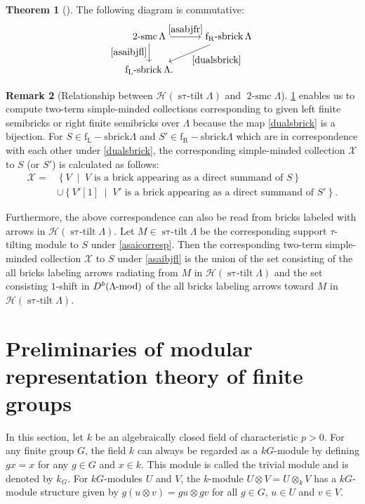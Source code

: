 \documentclass[pdftex,a4paper]{article}
\numberwithin{equation}{subsection}
\theoremstyle{definition}
\newtheorem{theorem}{Theorem}[section]
\newtheorem{remark}[theorem]{Remark}
\newcommand{\setmid}{\; \middle|\;}
\newcommand{\lmod}{\operatorname{\mathrm{\hspace{-2pt}-mod}}}
\newcommand{\stautilt}{\operatorname{\mathrm{s\tau-tilt}}}
\newcommand{\flsbrick}{\operatorname{\mathrm{f_L-sbrick}}}
\newcommand{\frsbrick}{\operatorname{\mathrm{f_R-sbrick}}}
\newcommand{\twosmc}{\operatorname{\mathrm{2-smc}}}
\begin{document}
\begin{theorem}	[{\cite[Theorem 3.3]{MR4139031}}]\label{sbricksmc 2021-09-06 15:11:30}
	The following diagram is commutative:
	\begin{equation}
		\begin{tikzcd}
			\twosmc \Lambda \ar[r,"\eqref{asabjfr}"] \ar[d,"\eqref{asaibjfl}"'] &\frsbrick \Lambda \ar[dl,"\eqref{dualsbrick}"]\\
			\flsbrick \Lambda. &
		\end{tikzcd}
	\end{equation}
\end{theorem}

\begin{remark}
	[Relationship between \(\mathcal{H}(\stautilt \Lambda)\) and \(\twosmc \Lambda\)]
	\cref{sbricksmc 2021-09-06 15:11:30} enables us to compute two-term simple-minded collections corresponding to given left finite semibricks or right finite semibricks over \(\Lambda\) because the map \eqref{dualsbrick} is a bijection.
	For \(S\in \flsbrick \Lambda\) and \(S'\in \frsbrick \Lambda\) which are in correspondence with each other under \eqref{dualsbrick}, the corresponding simple-minded collection \(\mathcal{X}\) to \(S\) (or \(S'\)) is calculated as follows:
	\begin{align}
		\mathcal{X}=
		 & \left\{ V \setmid \text{\(V\) is a brick appearing as a direct summand of \(S\)} \right\}            \\
		 & \cup\left\{ V'[1] \setmid \text{\(V'\) is a brick appearing as a direct summand of \(S'\)} \right\}.
	\end{align}

	Furthermore, the above correspondence can also be read from bricks labeled with arrows in \(\mathcal{H}(\stautilt \Lambda)\).
	Let \(M\in \stautilt
	\Lambda\) be the corresponding support \(\tau\)-tilting module to \(S\) under \eqref{asaicorresp}.
	Then the corresponding two-term simple-minded collection \(\mathcal{X}\) to \(S\) under \eqref{asaibjfl} is the union of the set consisting of the all bricks labeling arrows radiating from \(M\) in \(\mathcal{H}(\stautilt \Lambda)\) and the set consisting \(1\)-shift in \(D^b(\Lambda\lmod)\) of the all bricks labeling arrows toward \(M\) in \(\mathcal{H}(\stautilt \Lambda)\).
\end{remark}
\section{Preliminaries of modular representation theory of finite groups}
In this section, let \(k\) be an algebraically closed field of characteristic \(p>0\).
For any  finite group \(G\), the field \(k\) can always be regarded as a \(kG\)-module by defining \(gx=x\) for
any \(g\in G\) and \(x \in k\).
This module is called the trivial module and is denoted by \(k_G\).
For \(kG\)-modules \(U\) and \(V\), the \(k\)-module \(U\otimes V =U \otimes_k V\) has a \(kG\)-module structure given by \(g(u\otimes v)=gu\otimes gv\) for all \(g \in G\), \(u \in U\) and \(v \in V\).
\end{document}
